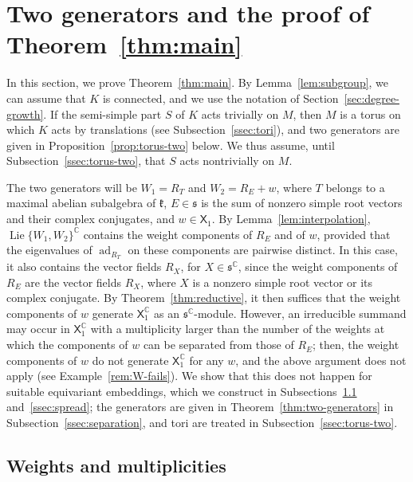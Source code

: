 \documentclass{article}
\newcommand{\C}{\mathbb{C}}
\newcommand{\frakk}{\mathfrak{k}}
\newcommand{\fraks}{\mathfrak{s}}
\newcommand{\sX}{\mathsf{X}}
\theoremstyle{definition}
\theoremstyle{plain}
\begin{document}
\section{Two generators and the proof of Theorem~\ref{thm:main}}\label{sec:two-generators}

In this section, we prove Theorem~\ref{thm:main}.
By Lemma~\ref{lem:subgroup}, we can assume that $K$ is connected, and we use the notation of Section~\ref{sec:degree-growth}.
If the semi-simple part $S$ of $K$ acts trivially on $M$, then $M$ is a torus on which $K$ acts by translations (see Subsection~\ref{ssec:tori}),
and two generators are given in Proposition~\ref{prop:torus-two} below.
We thus assume, until Subsection~\ref{ssec:torus-two}, that $S$ acts nontrivially on $M$.

The two generators will be $W_1=R_T$ and $W_2=R_E+w$, where $T$ belongs to a maximal abelian subalgebra of $\frakk$,
  $E\in\fraks$ is the sum of nonzero simple root vectors and their complex conjugates, and $w\in\sX_1$.
By Lemma~\ref{lem:interpolation}, $\operatorname{Lie}\{W_1,W_2\}^\C$ contains the weight components of $R_E$ and of $w$, provided that the eigenvalues of $\operatorname{ad}_{R_T}$ on these components are pairwise distinct.
In this case, it also contains the vector fields $R_X$, for $X\in\fraks^\C$, since the weight components of $R_E$ are the vector fields $R_X$,
    where $X$ is a nonzero simple root vector or its complex conjugate.
By Theorem~\ref{thm:reductive}, it then suffices that the weight components of $w$ generate $\sX_1^\C$ as an $\fraks^\C$-module.
However, an irreducible summand may occur in $\sX_1^\C$ with a multiplicity larger than the number of the weights at which the components of $w$ can be separated from those of $R_E$; then,
    the weight components of $w$ do not generate $\sX_1^\C$ for any $w$, and the above argument does not apply (see Example~\ref{rem:W-fails}).
We show that this does not happen for suitable equivariant embeddings, which we construct in Subsections~\ref{ssec:weights} and~\ref{ssec:spread}; the generators are given in Theorem~\ref{thm:two-generators} in Subsection~\ref{ssec:separation}, and tori are treated in Subsection~\ref{ssec:torus-two}.


\subsection{Weights and multiplicities}\label{ssec:weights}
\end{document}
